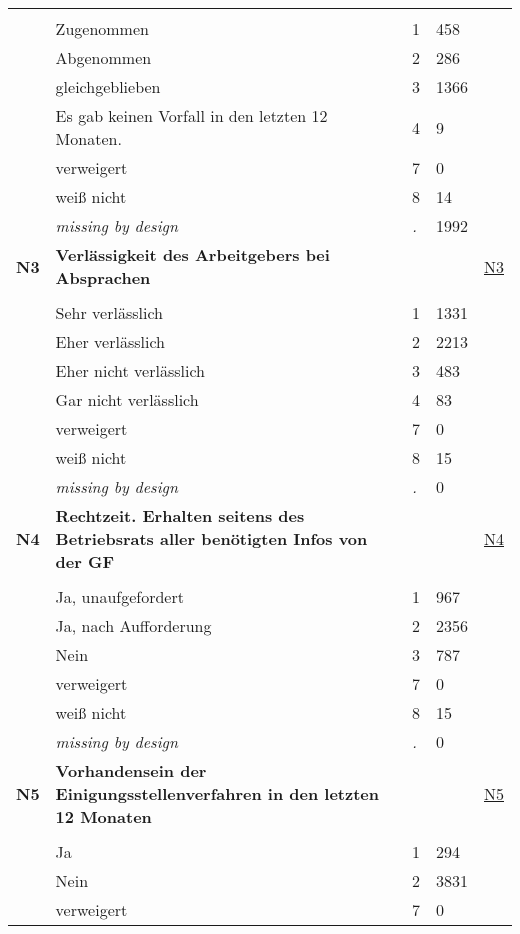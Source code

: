 \begin{longtable}{| L{2.65cm} | L{8cm} | C{1.5cm} | R{1.25cm} | C{2.25cm}  |}
   &  &  &  &  \\ 
   & Zugenommen & 1 & 458 &  \\ 
   & Abgenommen & 2 & 286 &  \\ 
   & gleichgeblieben & 3 & 1366 &  \\ 
   & Es gab keinen Vorfall in den letzten 12 Monaten. & 4 & 9 &  \\ 
   & verweigert & 7 & 0 &  \\ 
   & weiß nicht & 8 & 14 &  \\ 
   & \textit{missing by design} & \textit{.} & 1992 &  \\ 
   \midrule
\textbf{N3}\label{var:N3} & \textbf{Verlässigkeit des Arbeitgebers bei Absprachen} &  &  & \hyperref[N3]{N3} \\ 
   &  &  &  &  \\ 
   & Sehr verlässlich & 1 & 1331 &  \\ 
   & Eher verlässlich & 2 & 2213 &  \\ 
   & Eher nicht verlässlich & 3 & 483 &  \\ 
   & Gar nicht verlässlich & 4 & 83 &  \\ 
   & verweigert & 7 & 0 &  \\ 
   & weiß nicht & 8 & 15 &  \\ 
   & \textit{missing by design} & \textit{.} & 0 &  \\ 
   \midrule
\textbf{N4}\label{var:N4} & \textbf{Rechtzeit. Erhalten seitens des Betriebsrats aller benötigten Infos von der GF} &  &  & \hyperref[N4]{N4} \\ 
   &  &  &  &  \\ 
   & Ja, unaufgefordert & 1 & 967 &  \\ 
   & Ja, nach Aufforderung & 2 & 2356 &  \\ 
   & Nein & 3 & 787 &  \\ 
   & verweigert & 7 & 0 &  \\ 
   & weiß nicht & 8 & 15 &  \\ 
   & \textit{missing by design} & \textit{.} & 0 &  \\ 
   \midrule
\textbf{N5}\label{var:N5} & \textbf{Vorhandensein der Einigungsstellenverfahren in den letzten 12 Monaten} &  &  & \hyperref[N5]{N5} \\ 
   &  &  &  &  \\ 
   & Ja & 1 & 294 &  \\ 
   & Nein & 2 & 3831 &  \\ 
   & verweigert & 7 & 0 &  \\ 

\end{longtable}
